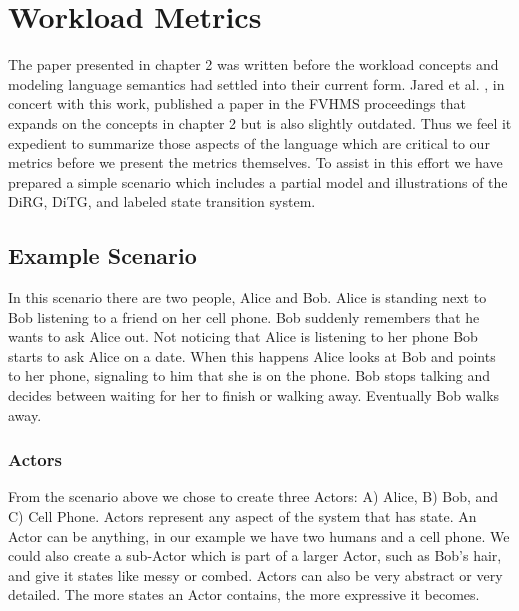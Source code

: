 \chapter{Workload Metrics} \label{ch:workload}
The paper presented in chapter 2 was written before the workload concepts and modeling language semantics had settled into their current form.  Jared et al. \cite{FVHMS}, in concert with this work, published a paper in the FVHMS proceedings that expands on the concepts in chapter 2 but is also slightly outdated.  Thus we feel it expedient to summarize those aspects of the language which are critical to our metrics before we present the metrics themselves.  To assist in this effort we have prepared a simple scenario which includes a partial model and illustrations of the DiRG, DiTG, and labeled state transition system.

\section{Example Scenario}
In this scenario there are two people, Alice and Bob.  Alice is standing next to Bob listening to a friend on her cell phone.  Bob suddenly remembers that he wants to ask Alice out.  Not noticing that Alice is listening to her phone Bob starts to ask Alice on a date.  When this happens Alice looks at Bob and points to her phone, signaling to him that she is on the phone.  Bob stops talking and decides between waiting for her to finish or walking away.  Eventually Bob walks away.

\subsection{Actors}
From the scenario above we chose to create three Actors: A) Alice, B) Bob, and C) Cell Phone.  Actors represent any aspect of the system that has state.  An Actor can be anything, in our example we have two humans and a cell phone.  We could also create a sub-Actor which is part of a larger Actor, such as Bob's hair, and give it states like messy or combed.  Actors can also be very abstract or very detailed.  The more states an Actor contains, the more expressive it becomes.

